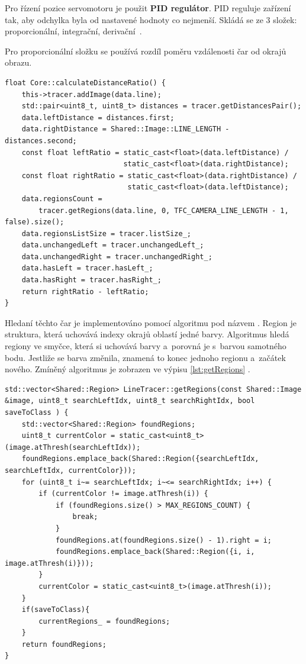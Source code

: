Pro řízení pozice servomotoru je použit \textbf{PID regulátor}. PID reguluje
zařízení tak, aby odchylka byla od nastavené hodnoty co nejmenší. Skládá se ze 3
složek: proporcionální, integrační, derivační~\cite{PID}.

Pro proporcionální složku se používá rozdíl poměru vzdálenosti čar od okrajů obrazu.
\begin{lstlisting}[caption = Kalkulace poměru vzdálenosti čar., label = lst:calculateDistanceRatio]
float Core::calculateDistanceRatio() {
    this->tracer.addImage(data.line);
    std::pair<uint8_t, uint8_t> distances = tracer.getDistancesPair();
    data.leftDistance = distances.first;
    data.rightDistance = Shared::Image::LINE_LENGTH - distances.second;
    const float leftRatio = static_cast<float>(data.leftDistance) /
                            static_cast<float>(data.rightDistance);
    const float rightRatio = static_cast<float>(data.rightDistance) /
                             static_cast<float>(data.leftDistance);
    data.regionsCount =
        tracer.getRegions(data.line, 0, TFC_CAMERA_LINE_LENGTH - 1, false).size();
    data.regionsListSize = tracer.listSize_;
    data.unchangedLeft = tracer.unchangedLeft_;
    data.unchangedRight = tracer.unchangedRight_;
    data.hasLeft = tracer.hasLeft_;
    data.hasRight = tracer.hasRight_;
    return rightRatio - leftRatio;
}
\end{lstlisting}

Hledaní těchto čar je implementováno pomocí algoritmu pod názvem . Region je struktura, která uchovává indexy okrajů oblastí jedné barvy.
Algoritmus hledá regiony ve smyčce, která si uchovává barvy a~porovná je s~barvou
samotného bodu. Jestliže se barva změnila, znamená to konec jednoho regionu
a~začátek nového. Zmíněný algoritmus je zobrazen ve výpisu \ref{lst:getRegions} 
\cite{robot}.

\begin{lstlisting}[caption = Algoritmus \uv{Hledání Regionu}., label = lst:getRegions]
std::vector<Shared::Region> LineTracer::getRegions(const Shared::Image &image, uint8_t searchLeftIdx, uint8_t searchRightIdx, bool saveToClass ) {
	std::vector<Shared::Region> foundRegions;
	uint8_t currentColor = static_cast<uint8_t>(image.atThresh(searchLeftIdx));
	foundRegions.emplace_back(Shared::Region({searchLeftIdx, searchLeftIdx, currentColor}));
	for (uint8_t i~= searchLeftIdx; i~<= searchRightIdx; i++) {
		if (currentColor != image.atThresh(i)) {
			if (foundRegions.size() > MAX_REGIONS_COUNT) {
				break;
			}
			foundRegions.at(foundRegions.size() - 1).right = i;
			foundRegions.emplace_back(Shared::Region({i, i, image.atThresh(i)}));
		}
		currentColor = static_cast<uint8_t>(image.atThresh(i));
	}
	if(saveToClass){
		currentRegions_ = foundRegions;
	}
	return foundRegions;
}
\end{lstlisting}

